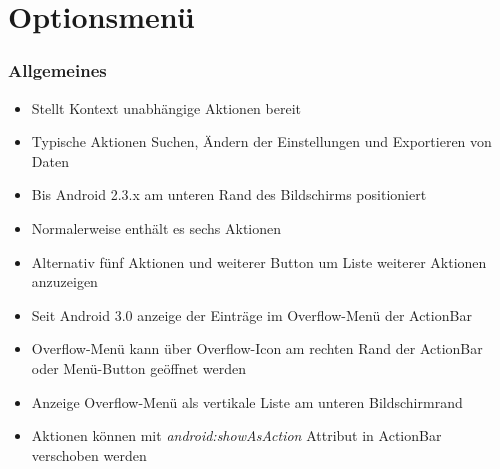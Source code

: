 \section{Optionsmenü}
\begin{frame}
   \frametitle{Allgemeines}
   \begin{itemize}
      \item Stellt Kontext unabhängige Aktionen bereit
      \item Typische Aktionen Suchen, Ändern der Einstellungen und Exportieren 
         von Daten
      \item Bis Android 2.3.x am unteren Rand des Bildschirms positioniert
      \item Normalerweise enthält es sechs Aktionen
      \item Alternativ fünf Aktionen und weiterer Button um Liste weiterer Aktionen anzuzeigen
      \item Seit Android 3.0 anzeige der Einträge im Overflow-Menü der ActionBar 
      \item Overflow-Menü kann über Overflow-Icon am rechten Rand 
         der ActionBar oder Menü-Button geöffnet werden
      \item Anzeige Overflow-Menü als vertikale Liste am unteren Bildschirmrand
      \item Aktionen können mit \emph{android:showAsAction} Attribut 
         in ActionBar verschoben werden
   \end{itemize}
\end{frame}

